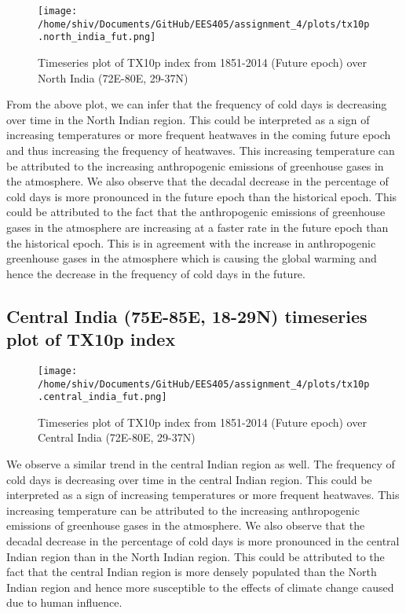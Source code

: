 \documentclass[a4paper, 12pt, twoside]{report}
\begin{document}
\begin{figure}[h]
    \centering
    \texttt{[image: /home/shiv/Documents/GitHub/EES405/assignment\_4/plots/tx10p.north\_india\_fut.png]}
    \caption{\centering Timeseries plot of TX10p index from 1851-2014 (Future epoch) over North India (72E-80E, 29-37N)}
    \label{fig:TX10p_timeseries_north_india_fut}
\end{figure}

From the above plot, we can infer that the frequency of cold days is decreasing over time in the North Indian region. This could be interpreted as a sign of increasing temperatures or more frequent heatwaves in the coming future epoch and thus increasing the frequency of heatwaves. This increasing temperature can be attributed to the increasing anthropogenic emissions of greenhouse gases in the atmosphere. We also observe that the decadal decrease in the percentage of cold days is more pronounced in the future epoch than the historical epoch. This could be attributed to the fact that the anthropogenic emissions of greenhouse gases in the atmosphere are increasing at a faster rate in the future epoch than the historical epoch. This is in agreement with the increase in anthropogenic greenhouse gases in the atmosphere which is causing the global warming and hence the decrease in the frequency of cold days in the future.
\subsection{Central India (75E-85E, 18-29N) timeseries plot of TX10p index}

\begin{figure}[h]
    \centering
    \texttt{[image: /home/shiv/Documents/GitHub/EES405/assignment\_4/plots/tx10p.central\_india\_fut.png]}
    \caption{\centering Timeseries plot of TX10p index from 1851-2014 (Future epoch) over Central India (72E-80E, 29-37N)}
    \label{fig:TX10p_timeseries_central_india_fut}
\end{figure}

We observe a similar trend in the central Indian region as well. The frequency of cold days is decreasing over time in the central Indian region. This could be interpreted as a sign of increasing temperatures or more frequent heatwaves. This increasing temperature can be attributed to the increasing anthropogenic emissions of greenhouse gases in the atmosphere. We also observe that the decadal decrease in the percentage of cold days is more pronounced in the central Indian region than in the North Indian region. This could be attributed to the fact that the central Indian region is more densely populated than the North Indian region and hence more susceptible to the effects of climate change caused due to human influence.
\newpage
\end{document}
